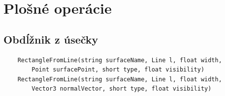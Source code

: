 













\section{Plošné operácie}

\subsection{Obdĺžnik z úsečky}


\begin{lstlisting}
	RectangleFromLine(string surfaceName, Line l, float width,
	    Point surfacePoint, short type, float visibility)
	RectangleFromLine(string surfaceName, Line l, float width,
	    Vector3 normalVector, short type, float visibility)
\end{lstlisting}

